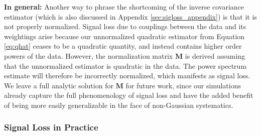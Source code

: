 \documentclass[preprint2,numberedappendix,tighten]{aastex6}  %
\newcommand{\dcj}[1]{{\color{orange} \textbf{[DCJ: #1]}}}
\begin{document}


{\bf In general:} Another way to phrase the shortcoming of the inverse covariance estimator (which is also discussed in Appendix \ref{sec:sigloss_appendix}) is that it is not properly normalized. Signal loss due to couplings between the data and its weightings arise because our unnormalized quadratic estimator from Equation \eqref{eq:qhat} ceases to be a quadratic quantity, and instead contains higher order powers of the data. However, the normalization matrix $\mathbf{M}$ is derived assuming that the unnormalized estimator is quadratic in the data. The power spectrum estimate will therefore be incorrectly normalized, which manifests as signal loss. We leave a full analytic solution for $\mathbf{M}$ for future work, since our simulations already capture the full phenomenology of signal loss and have the added benefit of being more easily generalizable in the face of non-Gaussian systematics.

\subsubsection{Signal Loss in Practice}
\label{sec:Practice}
\end{document}
